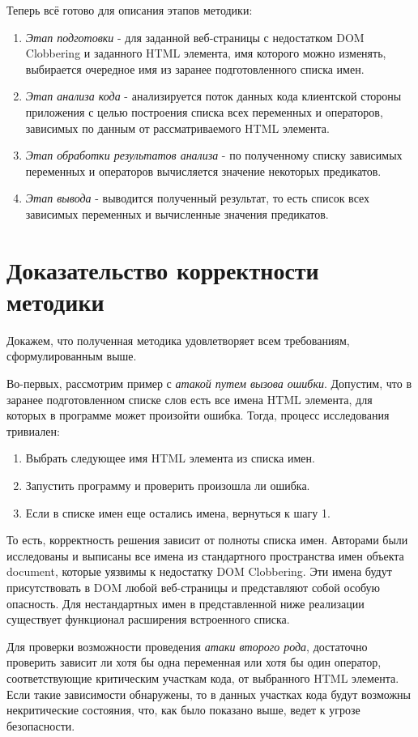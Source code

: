 Теперь всё готово для описания этапов методики:
\begin{enumerate}
	\item \textit{Этап подготовки} - для заданной веб-страницы с недостатком DOM Clobbering и заданного HTML элемента, имя которого можно изменять, выбирается очередное имя из заранее подготовленного списка имен.
	\item \textit{Этап анализа кода} - анализируется поток данных кода клиентской стороны приложения с целью построения списка всех переменных и операторов, зависимых по данным от рассматриваемого HTML элемента.
	\item \textit{Этап обработки результатов анализа} - по полученному списку зависимых переменных и операторов вычисляется значение некоторых предикатов.
	\item \textit{Этап вывода} - выводится полученный результат, то есть список всех зависимых переменных и вычисленные значения предикатов.
\end{enumerate}
\bigskip

\section{Доказательство корректности методики}
Докажем, что полученная методика удовлетворяет всем требованиям, сформулированным выше.


Во-первых, рассмотрим пример с \textit{атакой путем вызова ошибки}. Допустим, что в заранее подготовленном списке слов есть все имена HTML элемента, для которых в программе может произойти ошибка. Тогда, процесс исследования тривиален: 
\begin{enumerate}
	\item Выбрать следующее имя HTML элемента из списка имен.
	\item Запустить программу и проверить произошла ли ошибка.
	\item Если в списке имен еще остались имена, вернуться к шагу 1.
\end{enumerate}
То есть, корректность решения зависит от полноты списка имен. Авторами были исследованы и выписаны все имена из стандартного пространства имен объекта document, которые уязвимы к недостатку DOM Clobbering. Эти имена будут присутствовать в DOM любой веб-страницы и представляют собой особую опасность. Для нестандартных имен в представленной ниже реализации существует функционал расширения встроенного списка.

\bigskip
Для проверки возможности проведения \textit{атаки второго рода}, достаточно проверить зависит ли хотя бы одна переменная или хотя бы один оператор, соответствующие критическим участкам кода, от выбранного HTML элемента. Если такие зависимости обнаружены, то в данных участках кода будут возможны некритические состояния, что, как было показано выше, ведет к угрозе безопасности.

